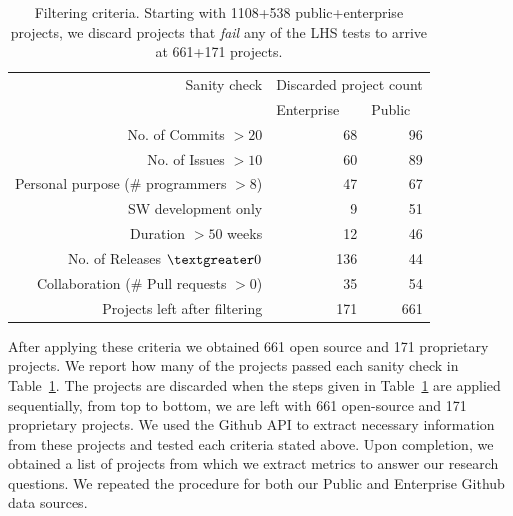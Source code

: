 \documentclass[sigconf]{acmart}
\theoremstyle{break}
\begin{document}
\begin{table}[!t]
\small
\centering
\caption{Filtering criteria. Starting with 1108+538  public+enterprise projects, we discard  projects that {\em fail}
any of the LHS tests to arrive at 661+171 projects.}
\begin{tabular}{|r|r|r|}
\hline
Sanity check & \multicolumn{2}{c|}{Discarded project count}                     \\ \cline{2-3} 
                                         & \multicolumn{1}{l|}{Enterprise} & \multicolumn{1}{l|}{Public} \\ \hline
No. of Commits $> 20$                           & 68                               & 96                       \\
No. of Issues  $> 10$                           & 60                               & 89                       \\
Personal purpose (\# programmers $> 8$)  & 47                               & 67                       \\
S\/W development only                    & 9                                & 51                       \\ 
Duration $> 50$ weeks                    & 12                               & 46                       \\
No. of Releases $\textgreater 0$                  & 136                              & 44                       \\
Collaboration (\# Pull requests $> 0$)      & 35                               & 54                      \\
\hline
Projects left after filtering                 & 171                              & 661                       \\ 
\hline
\end{tabular}
\label{tab:sanity}
\vspace{-0.2cm}
\end{table}

 After applying these criteria we obtained 661 open source and 171 proprietary projects. We report how many of the projects passed each sanity check in Table~\ref{tab:sanity}. The projects are discarded when the steps given in Table~\ref{tab:sanity} are applied sequentially, from top to bottom, we are left with 661 open-source and 171 proprietary projects. We used the Github API to extract necessary information from these projects and tested each criteria stated above. Upon completion, we obtained a list of projects from which we extract metrics to answer our research questions. We repeated the procedure for both our Public and Enterprise Github data sources. 
 
\end{document}

